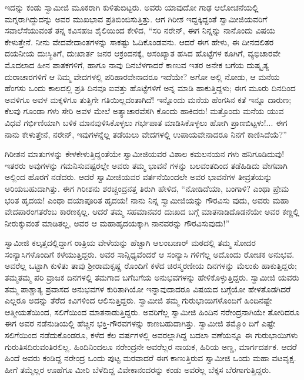 ಇದನ್ನು ಕಂಡು ಸ್ವಾಮೀಜಿ ಮೂಕರಾಗಿ ಕುಳಿತುಬಿಟ್ಟರು. ಅವರು ಯಾವುದೋ ಗಾಢ ಆಲೋಚನೆಯಲ್ಲಿ ಮಗ್ನರಾಗಿದ್ದುದನ್ನು ಅವರ ಮುಖಭಾವ ಪ್ರತಿಬಿಂಬಿಸುತ್ತಿತ್ತು. ಆಗ ಗಿರೀಶ ಇದ್ದಕ್ಕಿದ್ದಂತೆ ಸ್ವಾಮೀಜಿಯವರಿಗೆ ಸವಾಲೆಸೆಯುವಂತೆ ತನ್ನ ಕವಿಸಹಜ ಶೈಲಿಯಿಂದ ಕೇಳಿದ, “ಸರಿ ನರೇನ್, ಈಗ ನಿನ್ನನ್ನು ನಾನೊಂದು ವಿಷಯ ಕೇಳುತ್ತೇನೆ. ನೀನು ವೇದವೇದಾಂತಗಳನ್ನು ಸಾಕಷ್ಟು ಓದಿಕೊಂಡವನು. ಆದರೆ ಈಗ ಹೇಳು, ಈ ದೀನದಲಿತರ ದಯನೀಯ ದುಃಸ್ಥಿತಿಗೆ, ದುಃಖಾರ್ತ ಜನರ ಆಕ್ರಂದನಕ್ಕೆ, ಅಸಂಖ್ಯಾತ ಹಸಿದ ಹೊಟ್ಟೆಗಳ ಕೂಗಿಗೆ, ವ್ಯಭಿಚಾರವೇ ಮೊದಲಾದ ಹೀನ ಪಾತಕಗಳಿಗೆ, ಹಾಗೂ ನಾವು ದಿನಬೆಳಗಾದರೆ ಕಾಣುವ ಇತರ ಅನೇಕ ಬಗೆಯ ದುಷ್ಕೃತ್ಯ ದುರಾಚಾರಗಳಿಗೆ ಆ ನಿಮ್ಮ ವೇದಗಳಲ್ಲಿ ಪರಿಹಾರವೇನಾದರೂ ಇದೆಯೇ? ಅಗೋ ಅಲ್ಲಿ ನೋಡು, ಆ ಮನೆಯ ಹೆಂಗಸು ಒಂದು ಕಾಲದಲ್ಲಿ ಪ್ರತಿ ದಿನವೂ ಐವತ್ತು ಹೊಟ್ಟೆಗಳಿಗೆ ಅನ್ನ ಮಾಡಿ ಹಾಕುತ್ತಿದ್ದಳು; ಈಗ ಮೂರು ದಿನದಿಂದ ಅವಳಿಗೂ ಅವಳ ಮಕ್ಕಳಿಗೂ ತುತ್ತಿಗೇ ಗತಿಯಿಲ್ಲದಂತಾಗಿದೆ! ಇನ್ನೊಂದು ಮನೆಯ ಹೆಂಗಸಿನ ಕತೆ ಇನ್ನೂ ದಾರುಣ; ಕೆಲವು ಗೂಂಡಾ ಗಳು ಸೇರಿ ಅವಳ ಮೇಲೆ ಅತ್ಯಾಚಾರವೆಸಗಿ ಕೊಂದು ಹಾಕಿದರು! ಮತ್ತೊಂದು ಮನೆಯ ಯುವ ವಿಧವೆ ಗರ್ಭಿಣಿಯಾಗಿ ಬಳಿಕ ಮಾನವುಳಿಸಿಕೊಳ್ಳಲು ಗರ್ಭಪಾತ ಮಾಡಿಸಿಕೊಳ್ಳಲು ಹೋಗಿ ಪ್ರಾಣಬಿಟ್ಟಳು!... ಈಗ ನಾನು ಕೇಳುತ್ತೇನೆ, ನರೇನ್, ಇವುಗಳನ್ನೆಲ್ಲ ತಡೆಯಲು ವೇದಗಳಲ್ಲಿ ಉಪಾಯವೇನಾದರೂ ನಿನಗೆ ಕಾಣಿಸಿದೆಯೆ?”

ಗಿರೀಶನ ಮಾತುಗಳನ್ನು ಕೇಳಕೇಳುತ್ತಿದ್ದಂತೆಯೇ ಸ್ವಾಮೀಜಿಯವರ ವಿಶಾಲ ಕಮಲನಯನ ಗಳು ಹನಿಗೂಡಿದುವು! ಇತರರು ಅವುಗಳನ್ನು ಗಮನಿಸುವಷ್ಟರಲ್ಲೇ ಅವರು ತಮ್ಮ ಭಾವನೆ ಗಳನ್ನು ಬಲವಂತದಿಂದ ತಡೆಹಿಡಿದು ವೇಗವಾಗಿ ಅಲ್ಲಿಂದ ಹೊರಗೆ ನಡೆದರು. ಆದರೆ ಸ್ವಾಮೀಜಿಯವರ ವರ್ತನೆಯಿಂದಲೇ ಅವರ ಭಾವನೆಗಳ ತೀವ್ರತೆಯನ್ನು ಅರಿಯಬಹುದಾಗಿತ್ತು. ಈಗ ಗಿರೀಶನು ಶರಚ್ಚಂದ್ರನತ್ತ ತಿರುಗಿ ಹೇಳಿದ, “ನೋಡಿದೆಯಾ, ಬಂಗಾಳಿ? ಎಂಥಾ ಪ್ರೇಮ ಭರಿತ ಹೃದಯ! ಎಂಥಾ ದಯಾಪೂರಿತ ಹೃದಯ! ನಾನು ನಿನ್ನ ಸ್ವಾಮೀಜಿಯನ್ನು ಗೌರವಿಸು ವುದು, ಅವರು ಮಹಾ ವೇದಪಾರಂಗತರೆಂಬ ಕಾರಣಕ್ಕಲ್ಲ. ಆದರೆ ತಮ್ಮ ಸಹಮಾನವರ ದುಃಖದ ಬಗ್ಗೆ ಮಾತನಾಡಿದೊಡನೆಯೇ ಅವರ ಕಣ್ಣಲ್ಲಿ ನೀರುಕ್ಕುವಂತೆ ಮಾಡಿತಲ್ಲ, ಅವರ ಆ ಮಹಾಹೃದಯಕ್ಕಾಗಿ ನಾನವರನ್ನು ಗೌರವಿಸುವುದು!”

ಸ್ವಾಮೀಜಿ ಕಲ್ಕತ್ತದಲ್ಲಿದ್ದಾಗ ರಾತ್ರಿಯ ವೇಳೆಯನ್ನು ಹೆಚ್ಚಾಗಿ ಆಲಂಬಜಾರ್ ಮಠದಲ್ಲಿ ತಮ್ಮ ಸೋದರ ಸಂನ್ಯಾಸಿಗಳೊಂದಿಗೆ ಕಳೆಯುತ್ತಿದ್ದರು. ಅವರ ಸಾನ್ನಿಧ್ಯವೆಂದರೆ ಆ ಸಂನ್ಯಾಸಿ ಗಳಿಗೆಲ್ಲ ಅದೊಂದು ರೋಚಕ ಅನುಭವ. ಅವರೆಲ್ಲ ಒಟ್ಟಾಗಿ ಕುಳಿತು ತಾವು ಶ್ರೀರಾಮಕೃಷ್ಣ ರೊಂದಿಗೆ ಕಳೆದ ಚಿರಸ್ಮರಣೀಯ ದಿನಗಳನ್ನು ಮೆಲುಕು ಹಾಕುತ್ತಿದ್ದರು; ತಮ್ಮತಮ್ಮ ಪರಿ ವ್ರಾಜಕ ದಿನಗಳಲ್ಲಿ ತಮಗಾದ ಬಗೆಬಗೆಯ ಅನುಭವಗಳನ್ನು ಹೇಳಿಕೊಳ್ಳುತ್ತಿದ್ದರು. ಸ್ವಾಮೀಜಿ ಯವರು ತಮ್ಮ ಪಾಶ್ಚಾತ್ಯ ಪ್ರವಾಸದ ಅನುಭವಗಳ ಕುರಿತಾಗಿಯೋ ಇನ್ನಾವುದಾದರೂ ವಿಷಯದ ಬಗ್ಗೆಯೋ ಹೇಳತೊಡಗಿದರೆ ಎಲ್ಲರೂ ಅದನ್ನು ತೆರೆದ ಕಿವಿಗಳಿಂದ ಆಲಿಸುತ್ತಿದ್ದರು. ಸ್ವಾಮೀಜಿ ತಮ್ಮ ಗುರುಭಾಯಿಗಳೊಂದಿಗೆ ಹಿಂದಿನಷ್ಟೇ ಆತ್ಮೀಯತೆಯಿಂದ, ಸಲಿಗೆಯಿಂದ ಮಾತನಾಡುತ್ತಿದ್ದರು. ಅವರಿಗೆಲ್ಲ ಸ್ವಾಮೀಜಿ ಹಿಂದಿನ ನರೇಂದ್ರನಾಗಿಯೇ ತೋರಿದರೂ ಈಗ ಅವರ ನಡೆನುಡಿಯಲ್ಲಿ ಹೆಚ್ಚಿನ ಭಕ್ತಿ-ಗೌರವಗಳನ್ನು ಕಾಣಬಹುದಾಗಿತ್ತು. ಸ್ವಾಮೀಜಿ ತಮ್ಮೊಂ ದಿಗೆ ಎಷ್ಟೇ ಸಲಿಗೆಯಿಂದ ನಡೆದುಕೊಂಡರೂ, ಕಳೆದ ಕೆಲ ವರ್ಷಗಳಲ್ಲಿ ಅವರಲ್ಲಾಗಿದ್ದ ಬದಲಾ ವಣೆಯನ್ನೂ ಈ ಗುರುಭಾಯಿಗಳು ಗುರುತಿಸದಿರುವಂತಿರಲಿಲ್ಲ. ಹಿಂದಿನಿಂದಲೂ ನರೇಂದ್ರನೇ ಅವರೆಲ್ಲರ ನಾಯಕ, ಹಿರಿಯ ಅಣ್ಣ, ಮಾರ್ಗದರ್ಶಕ. ಆದರೆ ಹಿಂದೆ ಅವರು ಕಂಡಿದ್ದ ನರೇಂದ್ರ ಒಂದು ಪುಟ್ಟ ಮರವಾದರೆ ಈಗ ಕಾಣುತ್ತಿರುವ ಸ್ವಾಮೀಜಿ ಒಂದು ಮಹಾ ವಟವೃಕ್ಷ. ಹೀಗೆ ತಮ್ಮೆಲ್ಲರ ಊಹೆಗೂ ಮೀರಿ ಬೆಳೆದಿದ್ದ ವಿವೇಕಾನಂದರನ್ನು ಕಂಡು ಅವರೆಲ್ಲ ಬೆಕ್ಕಸ ಬೆರಗಾಗುತ್ತಿದ್ದರು.

